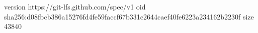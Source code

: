 version https://git-lfs.github.com/spec/v1
oid sha256:d08fbcb386a15276fd4fe59faccf67b331c2644caef40fe6223a234162b2230f
size 43840
